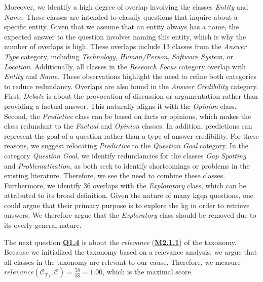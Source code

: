 Moreover, we identify a high degree of overlap involving the classes \emph{Entity} and \emph{Name}. These classes are intended to classify questions that inquire about a specific entity. Given that we assume that an entity always has a name, the expected answer to the question involves naming this entity, which is why the number of overlaps is high. These overlaps include 13 classes from the \emph{Answer Type} category, including \emph{Technology}, \emph{Human/Person}, \emph{Software System}, or \emph{Location}. Additionally, all classes in the \emph{Research Focus} category overlap with \emph{Entity} and \emph{Name}. These observations highlight the need to refine both categories to reduce redundancy. Overlaps are also found in the \emph{Answer Credibility} category. First, \emph{Debate} is about the provocation of discussion or argumentation rather than providing a factual answer. This naturally aligns it with the \emph{Opinion} class. Second, the \emph{Predictive} class can be based on facts or opinions, which makes the class redundant to the \emph{Factual} and \emph{Opinion} classes. In addition, predictions can represent the goal of a question rather than a type of answer credibility. For these reasons, we suggest relocating \emph{Predictive} to the \emph{Question Goal} category. In the category \emph{Question Goal}, we identify redundancies for the classes \emph{Gap Spotting} and \emph{Problematization}, as both seek to identify shortcomings or problems in the existing literature. Therefore, we see the need to combine these classes. Furthermore, we identify 36 overlaps with the \emph{Exploratory} class, which can be attributed to its broad definition. Given the nature of many \gls{kgqa} questions, one could argue that their primary purpose is to explore the \gls{kg} in order to retrieve answers. We therefore argue that the \emph{Exploratory} class should be removed due to its overly general nature.

\begin{sloppypar}
The next question \hyperref[tab:gqm_taxonomy_validation]{\textbf{Q1.4}} is about the \emph{relevance} (\hyperref[tab:gqm_taxonomy_validation]{\textbf{M2.1.1}}) of the taxonomy. Because we initialized the taxonomy based on a relevance analysis, we argue that all classes in the taxonomy are relevant to our cause. Therefore, we measure $relevance(\mathcal{C}_{\mathcal{T}_1}, \mathcal{C}) = \frac{58}{58} = 1.00$, which is the maximal score.
\end{sloppypar}

